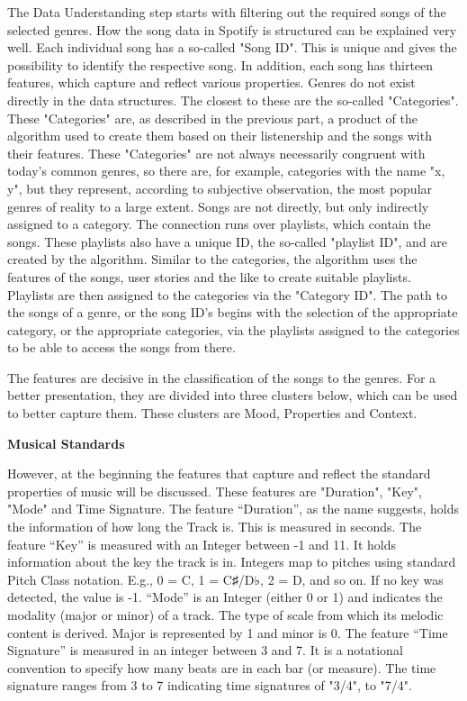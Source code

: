 The Data Understanding step starts with filtering out the required songs of the selected genres. 
How the song data in Spotify is structured can be explained very well.
Each individual song has a so-called "Song ID". 
This is unique and gives the possibility to identify the respective song.
In addition, each song has thirteen features, which capture and reflect various properties. 
Genres do not exist directly in the data structures. The closest to these are the so-called "Categories". 
These "Categories" are, as described in the previous part, a product of the algorithm used
to create them based on their listenership and the songs with their features. 
These "Categories" are not always necessarily congruent with today's common genres,
so there are, for example, categories with the name "x, y", but they represent, 
according to subjective observation, the most popular genres of reality to a large extent.
Songs are not directly, but only indirectly assigned to a category. 
The connection runs over playlists, which contain the songs.
These playlists also have a unique ID, the so-called "playlist ID", and are created by the algorithm. 
Similar to the categories, the algorithm uses the features of the songs,
user stories and the like to create suitable playlists. 
Playlists are then assigned to the categories via the "Category ID".
The path to the songs of a genre, or the song ID's begins with the selection of the appropriate category,
or the appropriate categories, via the playlists assigned to the categories
to be able to access the songs from there.

The features are decisive in the classification of the songs to the genres.
For a better presentation, they are divided into three clusters below, 
which can be used to better capture them. These clusters are Mood, Properties and Context.

\textbf{Musical Standards}

However, at the beginning the features that capture and reflect the standard properties of music will
be discussed. These features are "Duration", "Key", "Mode" and Time Signature. 
The feature “Duration”, as the name suggests, holds the information of how long the Track is.
This is measured in seconds. The feature “Key” is measured with an Integer between -1 and 11.
It holds information about the key the track is in. Integers map to pitches using
standard Pitch Class notation. 
E.g., 0 = C, 1 = C♯/D♭, 2 = D, and so on. If no key was detected, the value is -1.
“Mode” is an Integer (either 0 or 1) and indicates the modality (major or minor) of a track. 
The type of scale from which its melodic content is derived. Major is represented by 1 and minor is 0. 
The feature “Time Signature” is measured in an integer between 3 and 7.
It is a notational convention to specify how many beats are in each bar (or measure). 
The time signature ranges from 3 to 7 indicating time signatures of "3/4", to "7/4".

